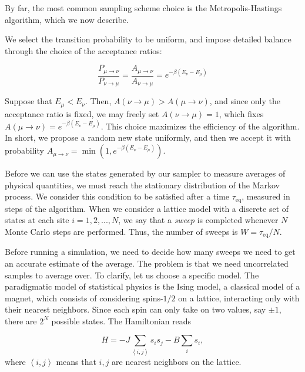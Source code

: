 By far, the most common sampling scheme choice is the Metropolis-Hastings algorithm, which we now  describe.

We select the transition probability to be uniform, and impose detailed balance through the choice of the acceptance ratios:

\begin{equation}
\frac{ P_{\mu\rightarrow\nu }}{ P_{\nu\rightarrow\mu }} = \frac{ A_{\mu\rightarrow\nu }}{ A_{\nu\rightarrow\mu } } = e^{-\beta ( E_\nu - E_\mu )}
\end{equation}

Suppose that $E_\mu < E_\nu $.
Then, $A ( \nu \rightarrow \mu ) > A ( \mu \rightarrow \nu ) $, and since only the acceptance ratio is fixed, we may freely set $A ( \nu \rightarrow \mu ) = 1$, which fixes $A ( \mu \rightarrow \nu ) = e^{-\beta ( E_\nu - E_\mu ) }$.
This choice maximizes the efficiency of the algorithm.
In short, we propose a random new state uniformly, and then we accept it with probability $A_{\mu\rightarrow \nu} = \min (1,  e^{-\beta ( E_\nu - E_\mu )})$.

Before we can use the states generated by our sampler to measure averages of physical quantities, we must reach the stationary distribution of the Markov process.
We consider this condition to be satisfied after a time $\tau_{\text{eq}}$, measured in steps of the algorithm.
When we consider a lattice model with a discrete set of states at each site $i = 1, 2, ..., N$, we say that a \emph{sweep} is completed whenever $N$ Monte Carlo steps are performed.
Thus, the number of  sweeps is $W = \tau_{\text{eq}} / N$.

Before running a simulation, we need to decide how many sweeps we need to get an accurate estimate of the average.
The problem is that we need uncorrelated samples to average over.
To clarify, let us choose a specific model.
The paradigmatic model of statistical physics is the Ising model, a classical model of a magnet, which consists of considering spins-$1/2$ on a lattice, interacting only with their nearest neighbors.
Since each spin can only take on two values, say $\pm 1$, there are $2^N$ possible states.
The Hamiltonian reads

\begin{equation}
H = - J \sum_{\left\langle i, j \right\rangle } s_i s_j - B \sum_i s_i ,
\end{equation}
where $\left\langle i, j \right\rangle$ means that $i, j $ are nearest neighbors on the lattice.

